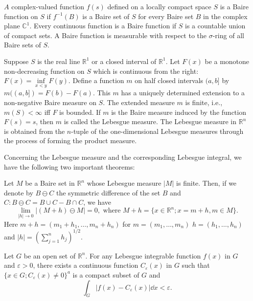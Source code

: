 \begin{definitionu} $A$ complex-valued function $f(s)$ defined on a locally compact space $S$ is a Baire function on $S$ if $f^{-1}(B)$ is a Baire set of $S$ for every Baire set $B$ in the complex plane $\mathbb{C}^{1}$. Every continuous function is a Baire function if $S$ is a countable union of compact sets. A Baire function is measurable with respect to the $\sigma$-ring of all Baire sets of $S$. 
\end{definitionu}


\begin{definitionu} Suppose $S$ is the real line $\mathbb{R}^{1}$ or a closed interval of $\mathbb{R}^{1}$. Let $F(x)$ be a monotone non-decreasing function on $S$ which is continuous from the right: $F(x) = \inf\limits_{x<y} F(y)$. Define a function $m$ on half closed intervals $(a, b]$ by $m((a, b]) = F(b)- F(a)$. This $m$ has a uniquely determined extension to a non-negative Baire measure on $S$. The extended measure $m$ is finite, i.e., $m(S) < \infty$ iff $F$ is bounded. If $m$ is the Baire measure induced by the function $F(s) = s$, then $m$ is called the Lebesgue measure. The Lebesgue measure in $\mathbb{R}^{n}$ is obtained from the $n$-tuple of the one-dimensional Lebesgue measures through the process of forming the product measure. 
\end{definitionu}

Concerning the Lebesgue measure and the corresponding Lebesgue integral, we have the following two important theorems: 

\begin{theorem}\label{thm:0.3.Theorem.1} Let $M$ be a Baire set in $\mathbb{R}^{n}$ whose Lebesgue measure $|M|$ is finite. Then, if we denote by $B \ominus C$ the symmetric difference of the set $B$ and $C: B \ominus C = B \cup C- B \cap C$, we have 
\[\lim\limits_{|h|\to 0}|(M + h)\ominus M| = 0, \text{ where } M + h = \{x\in \mathbb{R}^{n}; x = m + h,m\in M\}.\] 
Here $m + h = (m_{1} + h_{1},\dots ,m_{n} + h_{n})$ for $m = (m_1,\dots ,m_n)$ $h = (h_1,\dots ,h_n)$ and $|h| = \left(\sum\limits_{j=1}^{n}h_{j}\right)^{1/2}$.
\end{theorem}

\begin{theorem}\label{thm:0.3.Theorem.2} Let $G$ be an open set of $\mathbb{R}^{n}$. For any Lebesgue integrable function $f(x)$ in $G$ and $\varepsilon > 0$, there exists a continuous function $C_{\varepsilon}(x)$ in $G$ such that $\{x \in G; C_{\varepsilon}(x) \neq 0\}^a$ is a compact subset of $G$ and 
\[
\int_{G} | f (x)- C _{\varepsilon} (x) | \dd x < \varepsilon .
\]
\end{theorem}


